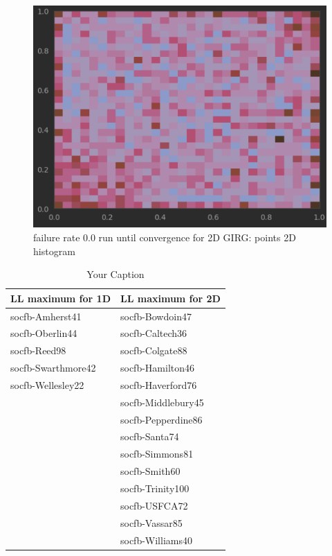 \begin{figure}
  \centering
  \includegraphics[width=\textwidth]{figures/MCMC_converged_to_cube.png}
  \caption{failure rate $0.0$ run until convergence for 2D GIRG: points 2D histogram}
\end{figure}


\begin{table}[ht]
  \centering
  \begin{tabular}{|l|l|}
  \hline
  \textbf{LL maximum for 1D} & \textbf{LL maximum for 2D} \\
  \hline
  socfb-Amherst41 & socfb-Bowdoin47 \\
  socfb-Oberlin44 & socfb-Caltech36 \\
  socfb-Reed98 & socfb-Colgate88 \\
  socfb-Swarthmore42 & socfb-Hamilton46 \\
  socfb-Wellesley22 & socfb-Haverford76 \\
  & socfb-Middlebury45 \\
  & socfb-Pepperdine86 \\
  & socfb-Santa74 \\
  & socfb-Simmons81 \\
  & socfb-Smith60 \\
  & socfb-Trinity100 \\
  & socfb-USFCA72 \\
  & socfb-Vassar85 \\
  & socfb-Williams40 \\
  \hline
  \end{tabular}
  \caption{Your Caption}
  \label{tab:my_label}
  \end{table}




